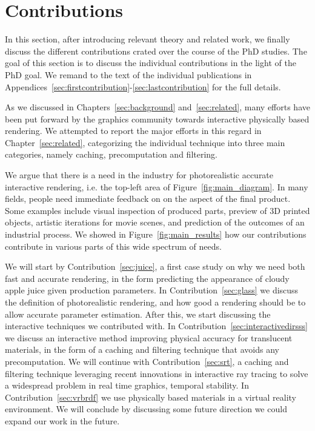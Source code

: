 \chapter{Contributions}
\label{sec:contributions}

In this section, after introducing relevant theory and related work, we finally discuss the different contributions crated over the course of the PhD studies. The goal of this section is to discuss the individual contributions in the light of the PhD goal. We remand to the text of the individual publications in Appendices~\ref{sec:firstcontribution}-\ref{sec:lastcontribution} for the full details.

As we discussed in Chapters~\ref{sec:background} and~\ref{sec:related}, many efforts have been put forward by the graphics community towards interactive physically based rendering. We attempted to report the major efforts in this regard in Chapter~\ref{sec:related}, categorizing the individual technique into three main categories, namely caching, precomputation and filtering.  

We argue that there is a need in the industry for photorealistic accurate interactive rendering, i.e. the top-left area of Figure~\ref{fig:main_diagram}. In many fields, people need immediate feedback on on the aspect of the final product. Some examples include visual inspection of produced parts, preview of 3D printed objects, artistic iterations for movie scenes, and prediction of the outcomes of an industrial process. We showed in Figure~\ref{fig:main_results} how our contributions contribute in various parts of this wide spectrum of needs.

We will start by Contribution~\ref{sec:juice}, a first case study on why we need both fast and accurate rendering, in the form predicting the appearance of cloudy apple juice given production parameters. In Contribution~\ref{sec:glass} we discuss the definition of photorealistic rendering, and how good a rendering should be to allow accurate parameter estimation. After this, we start discussing the interactive techniques we contributed with. In Contribution~\ref{sec:interactivedirsss} we discuss an interactive method improving physical accuracy for translucent materials, in the form of a caching and filtering technique that avoids any precomputation. We will continue with Contribution~\ref{sec:srt}, a caching and filtering technique leveraging recent innovations in interactive ray tracing to solve a widespread problem in real time graphics, temporal stability. In Contribution~\ref{sec:vrbrdf} we use physically based materials in a virtual reality environment. We will conclude by discussing some future direction we could expand our work in the future.

